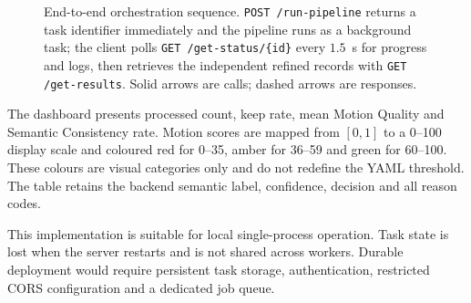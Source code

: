 \documentclass[11pt,oneside]{report}
\begin{document}
\begin{figure}[htbp]
\centering
{}
\caption[End-to-end orchestration sequence]{End-to-end orchestration sequence. \texttt{POST /run-pipeline} returns a
task identifier immediately and the pipeline runs as a background task; the client
polls \texttt{GET /get-status/\{id\}} every $1.5$~s for progress and logs, then
retrieves the independent refined records with \texttt{GET /get-results}. Solid
arrows are calls; dashed arrows are responses.}
\label{fig:orchestration}
\end{figure}

The dashboard presents processed count, keep rate, mean Motion Quality and
Semantic Consistency rate. Motion scores are mapped from $[0,1]$ to a 0--100
display scale and coloured red for 0--35, amber for 36--59 and green for
60--100. These colours are visual categories only and do not redefine the YAML
threshold. The table retains the backend semantic label, confidence, decision
and all reason codes.

This implementation is suitable for local single-process operation. Task state
is lost when the server restarts and is not shared across workers. Durable
deployment would require persistent task storage, authentication, restricted
CORS configuration and a dedicated job queue.
\end{document}
